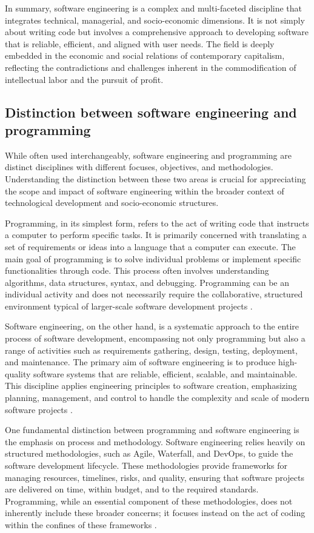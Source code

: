 \begin{refsection}
In summary, software engineering is a complex and multi-faceted discipline that integrates technical, managerial, and socio-economic dimensions. It is not simply about writing code but involves a comprehensive approach to developing software that is reliable, efficient, and aligned with user needs. The field is deeply embedded in the economic and social relations of contemporary capitalism, reflecting the contradictions and challenges inherent in the commodification of intellectual labor and the pursuit of profit.

\subsection{Distinction between software engineering and programming}

While often used interchangeably, software engineering and programming are distinct disciplines with different focuses, objectives, and methodologies. Understanding the distinction between these two areas is crucial for appreciating the scope and impact of software engineering within the broader context of technological development and socio-economic structures.

Programming, in its simplest form, refers to the act of writing code that instructs a computer to perform specific tasks. It is primarily concerned with translating a set of requirements or ideas into a language that a computer can execute. The main goal of programming is to solve individual problems or implement specific functionalities through code. This process often involves understanding algorithms, data structures, syntax, and debugging. Programming can be an individual activity and does not necessarily require the collaborative, structured environment typical of larger-scale software development projects \cite[pp.~10-12]{hunt1999pragmatic}.

Software engineering, on the other hand, is a systematic approach to the entire process of software development, encompassing not only programming but also a range of activities such as requirements gathering, design, testing, deployment, and maintenance. The primary aim of software engineering is to produce high-quality software systems that are reliable, efficient, scalable, and maintainable. This discipline applies engineering principles to software creation, emphasizing planning, management, and control to handle the complexity and scale of modern software projects \cite[pp.~16-18]{pressman2014software}.

One fundamental distinction between programming and software engineering is the emphasis on process and methodology. Software engineering relies heavily on structured methodologies, such as Agile, Waterfall, and DevOps, to guide the software development lifecycle. These methodologies provide frameworks for managing resources, timelines, risks, and quality, ensuring that software projects are delivered on time, within budget, and to the required standards. Programming, while an essential component of these methodologies, does not inherently include these broader concerns; it focuses instead on the act of coding within the confines of these frameworks \cite[pp.~77-82]{sommerville2016software}.


\end{refsection}

